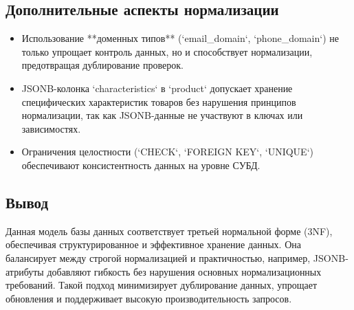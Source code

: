 \subsection{Дополнительные аспекты нормализации}\label{subsec:normalizationadditional}
\begin{itemize}
    \item Использование **доменных типов** (`email\_domain`, `phone\_domain`)
    не только упрощает контроль данных, но и способствует нормализации, предотвращая дублирование проверок.
    \item JSONB-колонка `characteristics` в `product` допускает хранение специфических
    характеристик товаров без нарушения принципов нормализации, так как JSONB-данные не
    участвуют в ключах или зависимостях.
    \item Ограничения целостности (`CHECK`, `FOREIGN KEY`, `UNIQUE`) обеспечивают
    консистентность данных на уровне СУБД.
\end{itemize}

\subsection{Вывод}\label{subsec:normalizationresult}
Данная модель базы данных соответствует третьей нормальной форме (3NF),
обеспечивая структурированное и эффективное хранение данных.
Она балансирует между строгой нормализацией и практичностью, например,
JSONB-атрибуты добавляют гибкость без нарушения основных нормализационных требований.
Такой подход минимизирует дублирование данных, упрощает обновления и поддерживает
высокую производительность запросов.

